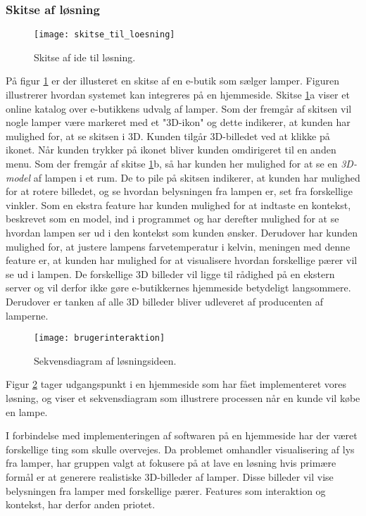 \subsubsection{Skitse af løsning}

\label{sec:skitse_loesning}

\begin{figure}[H]
   \centering
   \texttt{[image: skitse\_til\_loesning]}
   \caption{Skitse af ide til løsning.}
   \label{fig:skitse_af_ide}
\end{figure}

På figur \ref{fig:skitse_af_ide} er der illusteret en skitse af en e-butik som sælger lamper. Figuren illustrerer hvordan systemet kan integreres på en hjemmeside. Skitse \ref{fig:skitse_af_ide}a viser et online katalog over e-butikkens udvalg af lamper. Som der fremgår af skitsen vil nogle lamper være markeret med et "3D-ikon" og dette indikerer, at kunden har mulighed for, at se skitsen i 3D. Kunden tilgår 3D-billedet ved at klikke på ikonet. Når kunden trykker på ikonet bliver kunden omdirigeret til en anden menu. Som der fremgår af skitse \ref{fig:skitse_af_ide}b, så har kunden her mulighed for at se en \textit{3D-model} af lampen i et rum. De to pile på skitsen indikerer, at kunden har mulighed for at rotere billedet, og se hvordan belysningen fra lampen er, set fra forskellige vinkler. Som en ekstra feature har kunden mulighed for at indtaste en kontekst, beskrevet som en model, ind i programmet og har derefter mulighed for at se hvordan lampen ser ud i den kontekst som kunden ønsker. 
Derudover har kunden mulighed for, at justere lampens farvetemperatur i kelvin, meningen med denne feature er, at kunden har mulighed for at visualisere hvordan forskellige pærer vil se ud i lampen. De forskellige 3D billeder vil ligge til rådighed på en ekstern server og vil derfor ikke gøre e-butikkernes hjemmeside betydeligt langsommere. Derudover er tanken af alle 3D billeder bliver udleveret af producenten af lamperne. 

\begin{figure}[H]
   \centering
   \texttt{[image: brugerinteraktion]}
   \caption{Sekvensdiagram af løsningsideen.}
   \label{fig:sekvensdiagram_af_ideen}
\end{figure}

Figur \ref{fig:sekvensdiagram_af_ideen} tager udgangspunkt i en hjemmeside som har fået implementeret vores løsning, og viser et sekvensdiagram som illustrere processen når en kunde vil købe en lampe.  

I forbindelse med implementeringen af softwaren på en hjemmeside har der været forskellige ting som skulle overvejes. Da problemet omhandler visualisering af lys fra lamper, har gruppen valgt at fokusere på at lave en løsning hvis primære formål er at generere realistiske 3D-billeder af lamper. Disse billeder vil vise belysningen fra lamper med forskellige pærer. Features som interaktion og kontekst, har derfor anden priotet. 

